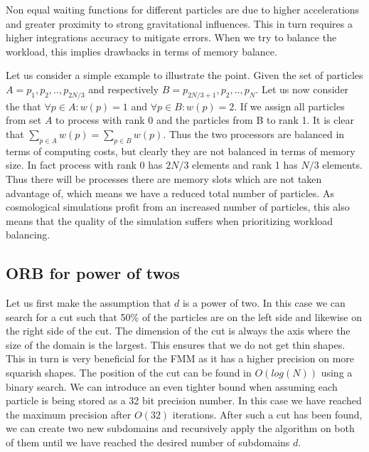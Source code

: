 \documentclass[]{article}
\begin{document}
Non equal waiting functions for different particles are due to higher accelerations and greater proximity to strong gravitational influences. This in turn requires a higher integrations accuracy to mitigate errors. When we try to balance the workload, this implies drawbacks in terms of memory balance. 

Let us consider a simple example to illustrate the point. Given the set of particles $A = {p_1, p_2, .., p_{2N/3}}$ and respectively $B = {p_{2N/3 + 1}, p_2, .., p_{N}}$. Let us now consider the that $\forall p \in A : w(p) = 1$ and $\forall p \in B : w(p) = 2$. If we assign all particles from set $A$ to process with rank 0 and the particles from B to rank 1. It is clear that $\sum_{p\in A}^{} w(p) = \sum_{p\in B}^{} w(p)$. Thus the two processors are balanced in terms of computing costs, but clearly they are not balanced in terms of memory size. In fact process with rank 0 has $2N/3$ elements and rank 1 has $N/3$ elements. Thus there will be processes there are memory slots which are not taken advantage of, which means we have a reduced total number of particles. As cosmological simulations profit from an increased number of particles, this also means that the quality of the simulation suffers when prioritizing workload balancing.


\subsection{ORB for power of twos}


Let us first make the assumption that $d$ is a power of two. In this case we can search for a cut such that 50\% of the particles are on the left side and likewise on the right side of the cut. The dimension of the cut is always the axis where the size of the domain is the largest. This ensures that we do not get thin shapes.  This in turn is very beneficial for the FMM as it has a higher precision on more squarish shapes.  The position of the cut can be found in $O(log(N))$ using a binary search. We can introduce an even tighter bound when assuming each particle is being stored as a 32 bit precision number. In this case we have reached the maximum precision after $O(32)$ iterations. After such a cut has been found, we can create two new subdomains and recursively apply the algorithm on both of them until we have reached the desired number of subdomains $d$. 
 
\vspace{5mm}
\end{document}

